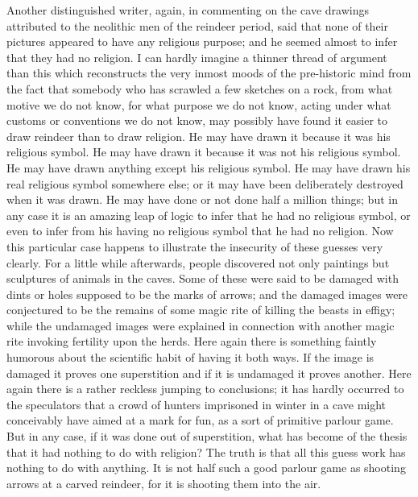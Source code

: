 Another distinguished writer, again, in commenting on the cave drawings attributed to the neolithic men of the reindeer period, said that none of their pictures appeared to have any religious purpose; and he seemed almost to infer that they had no religion. I can hardly imagine a thinner thread of argument than this which reconstructs the very inmost moods of the pre-historic mind from the fact that somebody who has scrawled a few sketches on a rock, from what motive we do not know, for what purpose we do not know, acting under what customs or conventions we do not know, may possibly have found it easier to draw reindeer than to draw religion. He may have drawn it because it was his religious symbol. He may have drawn it because it was not his religious symbol. He may have drawn anything except his religious symbol. He may have drawn his real religious symbol somewhere else; or it may have been deliberately destroyed when it was drawn. He may have done or not done half a million things; but in any case it is an amazing leap of logic to infer that he had no religious symbol, or even to infer from his having no religious symbol that he had no religion. Now this particular case happens to illustrate the insecurity of these guesses very clearly. For a little while afterwards, people discovered not only paintings but sculptures of animals in the caves. Some of these were said to be damaged with dints or holes supposed to be the marks of arrows; and the damaged images were conjectured to be the remains of some magic rite of killing the beasts in effigy; while the undamaged images were explained in connection with another magic rite invoking fertility upon the herds. Here again there is something faintly humorous about the scientific habit of having it both ways. If the image is damaged it proves one superstition and if it is undamaged it proves another. Here again there is a rather reckless jumping to conclusions; it has hardly occurred to the speculators that a crowd of hunters imprisoned in winter in a cave might conceivably have aimed at a mark for fun, as a sort of primitive parlour game. But in any case, if it was done out of superstition, what has become of the thesis that it had nothing to do with religion? The truth is that all this guess work has nothing to do with anything. It is not half such a good parlour game as shooting arrows at a carved reindeer, for it is shooting them into the air.

